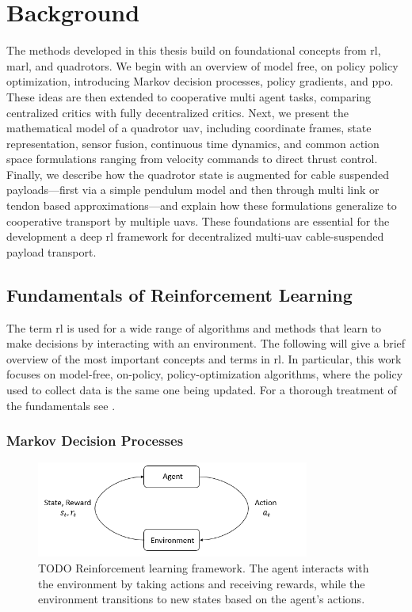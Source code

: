 \chapter{Background}
The methods developed in this thesis build on foundational concepts from \gls{rl}, \gls{marl}, and quadrotors. We begin with an overview of model free, on policy policy optimization, introducing Markov decision processes, policy gradients, and \gls{ppo}. These ideas are then extended to cooperative multi agent tasks, comparing centralized critics with fully decentralized critics. Next, we present the mathematical model of a quadrotor \gls{uav}, including coordinate frames, state representation, sensor fusion, continuous time dynamics, and common action space formulations ranging from velocity commands to direct thrust control. Finally, we describe how the quadrotor state is augmented for cable suspended payloads—first via a simple pendulum model and then through multi link or tendon based approximations—and explain how these formulations generalize to cooperative transport by multiple \glspl{uav}. These foundations are essential for the development a deep \gls{rl} framework for decentralized multi-\gls{uav} cable-suspended payload transport.

\section{Fundamentals of Reinforcement Learning}
The term \gls{rl} is used for a wide range of algorithms and methods that learn to make decisions by interacting with an environment. The following will give a brief overview of the most important concepts and terms in \gls{rl}. In particular, this work focuses on model-free, on-policy, policy-optimization algorithms, where the policy used to collect data is the same one being updated. For a thorough treatment of the fundamentals see \cite{SuttonBarto2018}.
\subsection{Markov Decision Processes}
\begin{figure}
\centering
\includegraphics[width=0.8\textwidth]{images/rl_diagram.png}
\caption{TODO   Reinforcement learning framework. The agent interacts with the environment by taking actions and receiving rewards, while the environment transitions to new states based on the agent's actions.}
\label{fig:rl_diagram}
\end{figure}

